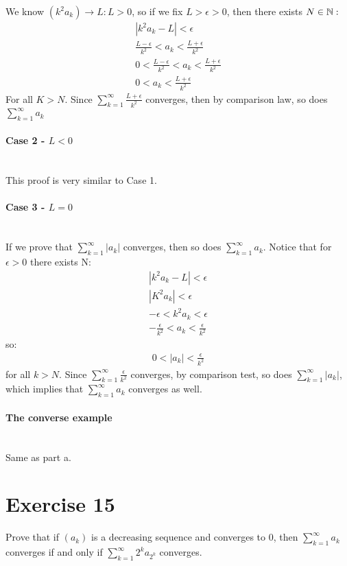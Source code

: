 \documentclass[11pt]{article}
\begin{document}
We know $(k^2a_k)\rightarrow L:L>0$, so if we fix $L>\epsilon>0$, then there exists $N\in\mathbb{N}:$
\begin{align*}
	|k^2a_k-L|<\epsilon\\
	\frac{L-\epsilon}{k^2}<a_k<\frac{L+\epsilon}{k^2}\\
	0<\frac{L-\epsilon}{k^2}<a_k<\frac{L+\epsilon}{k^2}\\
	0<a_k<\frac{L+\epsilon}{k^2}
\end{align*}
For all $K>N$. Since $\sum\limits_{k=1}^{\infty}\frac{L+\epsilon}{k^2}$ converges, then by comparison law, so does $\sum\limits_{k=1}^{\infty}a_k$

\paragraph{Case 2 - $L<0$} ~\\

This proof is very similar to Case 1.

\paragraph{Case 3 - $L=0$} ~\\

If we prove that $\sum\limits_{k=1}^{\infty}|a_k|$ converges, then so does $\sum\limits_{k=1}^{\infty}a_k$.
Notice that for $\epsilon>0$ there exists N:
\begin{align*}
	{|k^2a_k-L|<\epsilon}\\
	{|K^2a_k|<\epsilon}\\
	{-\epsilon<k^2a_k<\epsilon}\\
	{-\frac{\epsilon}{k^2}}<a_k<\frac{\epsilon}{k^2}
\end{align*}
so:
\begin{align*}
	0<|a_k|<\frac{\epsilon}{k^2}
\end{align*}
for all $k>N$. Since $\sum\limits_{k=1}^{\infty}\frac{\epsilon}{k^2}$ converges, by comparison test, so does $\sum\limits_{k=1}^{\infty}|a_k|$, which implies that $\sum\limits_{k=1}^{\infty}a_k$ converges as well.

\paragraph{The converse example} ~\\ 

Same as part a.

\section*{Exercise 15}
Prove that if $(a_k)$ is a decreasing sequence and converges to 0, then $\sum\limits_{k=1}^{\infty}a_k$ converges if and only if $\sum\limits_{k=1}^{\infty}2^k a_{2^k}$ converges.
\end{document}
